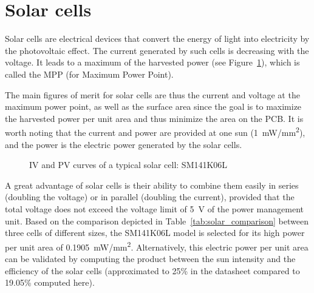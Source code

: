 \documentclass{EPL-master-thesis-covers-EN}
\begin{document}
\section{Solar cells}
\label{section:solar_cells}

Solar cells are electrical devices that convert the energy of light into electricity by the photovoltaic effect. The current generated by such cells is decreasing with the voltage. It leads to a maximum of the harvested power (see Figure~\ref{fig:solar_IV}), which is called the MPP (for Maximum Power Point).

The main figures of merit for solar cells are thus the current and voltage at the maximum power point, as well as the surface area since the goal is to maximize the harvested power per unit area and thus minimize the area on the PCB. It is worth noting that the current and power are provided at one sun (\SI{1}{mW/mm^2}), and the power is the electric power generated by the solar cells.

\begin{figure}[H]
    \centering
    
    \caption{IV and PV curves of a typical solar cell: SM141K06L}
    \label{fig:solar_IV}
\end{figure}


A great advantage of solar cells is their ability to combine them easily in series (doubling the voltage) or in parallel (doubling the current), provided that the total voltage does not exceed the voltage limit of \SI{5}{V} of the power management unit. Based on the comparison depicted in Table~\ref{tab:solar_comparison} between three cells of different sizes, the SM141K06L model is selected for its high power per unit area of \SI{0.1905}{mW/mm^2}. Alternatively, this electric power per unit area can be validated by computing the product between the sun intensity and the efficiency of the solar cells (approximated to 25\% in the datasheet compared to 19.05\% computed here).

\begin{table}[H]
\centering
{}
\caption{Comparison of several solar cells}
\label{tab:solar_comparison}
\end{table}
\end{document}
